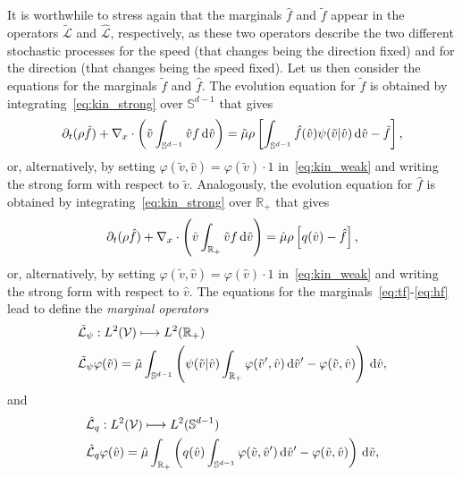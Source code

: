\documentclass[a4paper]{article}
\theoremstyle{Theorem}\newtheorem{proposition}{Proposition}[section]
\theoremstyle{Remark}\newtheorem{remark}{Remark}[section]
\theoremstyle{Theorem}\newtheorem{theorem}{Theorem}[section]
\newcommand{\R}{\mathbb{R}}
\newcommand{\hv}{\hat{v}}
\newcommand{\tv}{\tilde{v}}
\newcommand{\hf}{\hat{f}}
\newcommand{\tf}{\tilde{f}}
\newcommand{\barf}{\rho}%
\newcommand{\hmu}{\hat{\mu}}
\newcommand{\tmu}{\tilde{\mu}}
\newcommand{\intS}{\int_{\mathbb{S}^{d-1}}}
\newcommand{\intR}{\int_{\R_+}}
\begin{document}
It is worthwhile to stress again that the marginals $\hf$ and $\tf$ appear in the operators $\tilde{\mathcal{L}}$ and $\hat{\mathcal{L}}$, respectively, as these two operators describe the two different stochastic processes for the speed (that changes being the direction fixed) and for the direction (that changes being the speed fixed).  Let us then consider the equations for the marginals $\tf$ and $\hf$. The evolution equation for $\tf$ is obtained by integrating~\eqref{eq:kin_strong} over $\mathbb{S}^{d-1}$ that gives 
\begin{equation}\label{eq:tf}
    \partial_t (\barf \tf) +\nabla_x \cdot \left( \tv \intS \hv f \, {\rm d} \hv\right) = \tmu \barf\left[ \intS \hf(\hv) \psi(\tv|\hv) \, {\rm d} \hv-\tf \right],
\end{equation}
or, alternatively, by setting $\varphi(\tv,\hv)=\varphi(\tv)\cdot 1$ in~\eqref{eq:kin_weak} and writing the strong form with respect to $\tv$.
Analogously, the evolution equation for $\hf$ is obtained by integrating~\eqref{eq:kin_strong} over $\R_+$ that gives
\begin{equation}\label{eq:hf}
 \partial_t (\barf \hf) +\nabla_x \cdot \left( \hv \intR \tv f \, {\rm d} \tv\right) = \hmu \barf\left[ q(\hv)-\hf \right] ,   
\end{equation}
or, alternatively, by setting $\varphi(\tv,\hv)=\varphi(\hv)\cdot 1$ in~\eqref{eq:kin_weak} and writing the strong form with respect to $\hv$.
The equations for the marginals~\eqref{eq:tf}-\eqref{eq:hf} lead to define the \textit{marginal operators} 
\begin{equation}\label{def:Lpsi}
\begin{aligned}[b]
    &\tilde{\mathcal{L}}_\psi: L^2(\mathcal{V}) \longmapsto L^2(\R_+) \\
    &\tilde{\mathcal{L}}_\psi\varphi(\tv) = \tmu\intS\left(  \psi(\tv|\hv)\intR \varphi(\tv',\hv) \, {\rm d} \tv' -\varphi(\tv,\hv)\right) \, {\rm d} \hv ,
    \end{aligned}
\end{equation}
and
\begin{equation}\label{def:Lq}
    \begin{aligned}[b]
    &\hat{\mathcal{L}}_q: L^2(\mathcal{V}) \longmapsto L^2(\mathbb{S}^{d-1}) \\
    &\hat{\mathcal{L}}_q\varphi(\hv) = \hmu\intR\left(  q(\hv)\intS \varphi(\tv,\hv') \, {\rm d} \hv' -\varphi(\tv,\hv)\right) \, {\rm d} \tv, 
    \end{aligned}
\end{equation}
\end{document}
